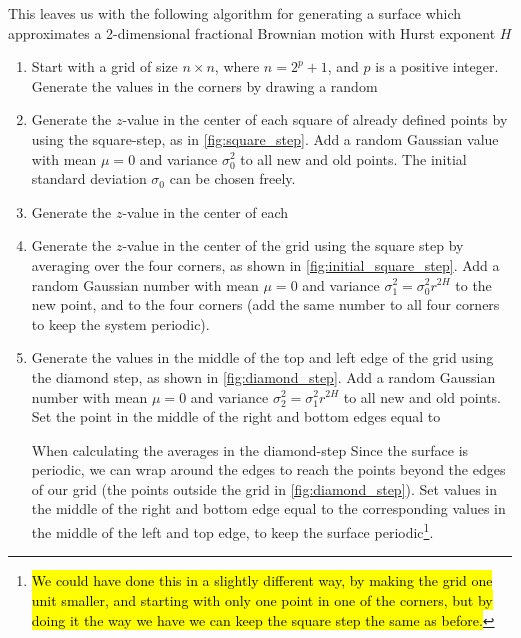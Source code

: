 This leaves us with the following algorithm for generating a surface which approximates a 2-dimensional fractional Brownian motion with Hurst exponent $H$
\begin{enumerate}
    \item Start with a grid of size $n \times n$, where $n = 2^p + 1$, and $p$ is a positive integer. Generate the values in the corners by drawing a random 
    
    \item Generate the $z$-value in the center of each square of already defined points by using the square-step, as in \cref{fig:square_step}. Add a random Gaussian value with mean $\mu = 0$ and variance $\sigma_0^2$ to all new and old points. The initial standard deviation $\sigma_0$ can be chosen freely.
    
    \item Generate the $z$-value in the center of each 
    
    \item Generate the $z$-value in the center of the grid using the square step by averaging over the four corners, as shown in \cref{fig:initial_square_step}. Add a random Gaussian number with mean $\mu = 0$ and variance $\sigma_1^2 = \sigma_0^2r^{2H}$ to the new point, and to the four corners (add the same number to all four corners to keep the system periodic).
    
    \item Generate the values in the middle of the top and left edge of the grid using the diamond step, as shown in \cref{fig:diamond_step}. Add a random Gaussian number with mean $\mu = 0$ and variance $\sigma_2^2 = \sigma_1^2r^{2H}$ to all new and old points. Set the point in the middle of the right and bottom edges equal to 
    
    When calculating the averages in the diamond-step  Since the surface is periodic, we can wrap around the edges to reach the points beyond the edges of our grid (the points outside the grid in \cref{fig:diamond_step}). Set values in the middle of the right and bottom edge equal to the corresponding values in the middle of the left and top edge, to keep the surface periodic\footnote{\hl{We could have done this in a slightly different way, by making the grid one unit smaller, and starting with only one point in one of the corners, but by doing it the way we have we can keep the square step the same as before.}}.
    

\end{enumerate}
